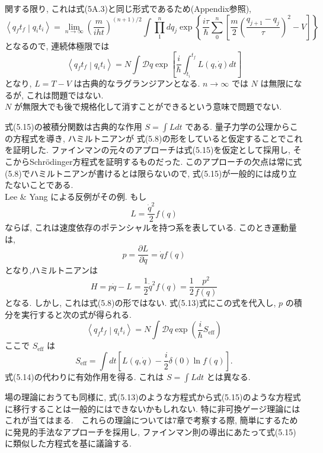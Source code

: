 \documentclass{jsarticle}
\newcommand{\braket}[2]{\left\langle #1\middle|#2\right\rangle}
\begin{document}
関する限り, これは式(5A.3)と同じ形式であるため(Appendix参照),
\begin{equation*}
    \braket{q_{f}t_{f}}{q_{i}t_{i}} = \lim_{n \rightarrow \infty} \left( \frac{m}{iht} \right)^{(n+1)/2} \int \prod_{1}^{n}dq_{j}\exp\left\{ \frac{i\tau}{\hbar}\sum_{0}^{n}\left[ \frac{m}{2} \left(\frac{q_{j+1} - q_{j}}{\tau}\right)^2 -V \right] \right\}\tag{5.14}
\end{equation*}
となるので, 連続体極限では
\begin{equation*}
    \braket{q_{f}t_{f}}{q_{i}t_{i}} = N\int \mathcal{D}q \exp\left[ \frac{i}{\hbar}\int_{t_i}^{t_f} L(q, \dot{q})dt \right] \tag{5.15}
\end{equation*}
となり, $L = T - V$ は古典的なラグランジアンとなる. $n \rightarrow \infty$ では $N$ は無限になるが, これは問題ではない.\\
\color{blue}
$N$ が無限大でも後で規格化して消すことができるという意味で問題でない.
\color{black}\par
式(5.15)の被積分関数は古典的な作用 $\displaystyle S = \int L dt$ である. 量子力学の公理からこの方程式を導き, ハミルトニアンが 式(5.8)の形をしていると仮定することでこれを証明した. ファインマンの元々のアプローチは式(5.15)を仮定として採用し, そこからSchr\"{o}dinger方程式を証明するものだった. このアプローチの欠点は常に式(5.8)でハミルトニアンが書けるとは限らないので, 式(5.15)が一般的には成り立たないことである.\\
 Lee \& Yang による反例がその例. もし
\begin{equation*}
    L = \frac{\dot{q}^2}{2}f(q)
\end{equation*} 
ならば, これは速度依存のポテンシャルを持つ系を表している. このとき運動量は,
\begin{equation*}
    p = \frac{\partial L}{\partial \dot{q}} = \dot{q}f(q)
\end{equation*}
となり,ハミルトニアンは
\begin{equation*}
    H = p\dot{q} - L = \frac{1}{2}\dot{q}^2 f(q) = \frac{1}{2}\frac{p^2}{f(q)}
\end{equation*}
となる. しかし, これは式(5.8)の形ではない. 式(5.13)式にこの式を代入し, $p$ の積分を実行すると次の式が得られる.
\begin{equation*}
    \braket{q_{f}t_{f}}{q_{i}t_{i}} = N\int \mathcal{D}q \exp\left( \frac{i}{\hbar}S_{\textrm{eff}} \right)
\end{equation*}
ここで $S_{\textrm{eff}}$ は
\begin{equation*}
    S_{\textrm{eff}} = \int dt \left[ L(q, \dot{q}) - \frac{i}{2}\delta(0)\ln f(q) \right].
\end{equation*}
式(5.14)の代わりに有効作用を得る. これは $\displaystyle S = \int L dt$ とは異なる.\par
場の理論におうても同様に, 式(5.13)のような方程式から式(5.15)のような方程式に移行することは一般的にはできないかもしれない. 特に非可換ゲージ理論にはこれが当てはまる.　これらの理論については7章で考察する際, 簡単にするために発見的手法なアプローチを採用し, ファインマン則の導出にあたって式(5.15)に類似した方程式を基に議論する.
\end{document}
